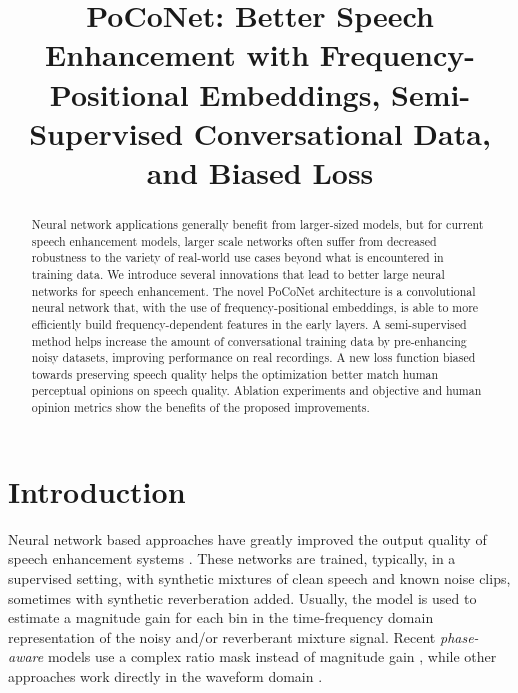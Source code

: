 \documentclass[english]{article}
\begin{document}
\address{}
\email{}
\address{Amazon Web Services}


\title{PoCoNet: Better Speech Enhancement with Frequency-Positional Embeddings, Semi-Supervised Conversational Data, and Biased Loss}


\maketitle
\begin{abstract}
    Neural network applications generally benefit from larger-sized models, but for current speech enhancement models, larger scale networks often suffer from decreased robustness to the variety of real-world use cases beyond what is encountered in training data. We introduce several innovations that lead to better large neural networks for speech enhancement. The novel PoCoNet architecture is a convolutional neural network that, with the use of frequency-positional embeddings, is able to more efficiently build frequency-dependent features in the early layers. 
    A semi-supervised method helps increase the amount of conversational training data by pre-enhancing noisy datasets, improving performance on real recordings. A new loss function biased towards preserving speech quality helps the optimization better match human perceptual opinions on speech quality. Ablation experiments and objective and human opinion metrics show the benefits of the proposed improvements.  

\end{abstract}


\section{Introduction}

Neural network based approaches have greatly improved the output quality of speech enhancement systems \cite{xia2013speech, xu2014regression, weninger2015speech, han2015learning, attentionwaveunet}. These networks are trained, typically, in a supervised setting, with synthetic mixtures of clean speech and known noise clips, sometimes with synthetic reverberation added. Usually, the model is used to estimate a magnitude gain for each bin in the time-frequency domain representation of the noisy and/or reverberant mixture signal. Recent \emph{phase-aware} models use a complex ratio mask instead of magnitude gain \cite{williamson2015complex, le2019phasebook}, while other approaches work directly in the waveform domain \cite{rethage2018wavenet, macartney2018improved, germain2018speech}. 
\end{document}
